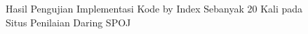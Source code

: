 \begin{appendices}
\begin{figure}[H]
    	\caption{Hasil Pengujian Implementasi Kode by Index Sebanyak 20 Kali pada Situs Penilaian Daring SPOJ}
    	\label{figure:value20}
    \end{figure}
  
  \end{appendices}
  
  
  
  